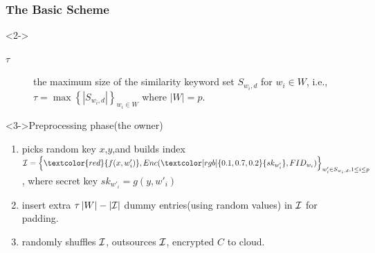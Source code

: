 \documentclass[handout]{beamer}
\begin{document}
\begin{frame}
	\frametitle{The Basic Scheme}
	\begin{block}<2->{}
		\begin{description}
			\item[$\tau $]the maximum size of the similarity keyword set $S_{{w_i},d}$ for ${w_i} \in W$, i.e.,$\tau  = \max {\left\{ {\left| {{S_{{w_i},d}}} \right|} \right\}_{{w_i} \in W}}$ where $\left| W \right| = p$.
		\end{description}
	\end{block}
		\begin{exampleblock}<3->{Preprocessing phase(the owner)}
			\begin{enumerate}
				\item<4->  picks random key $x$,$y$,and builds index ${\cal I} = {\left\{ {\textcolor{red}{f(x,w{'_i})},Enc(\textcolor[rgb]{0.1,0.7,0.2}{s{k_{w{'_i}}}},FI{D_{{w_i}}})} \right\}_{w{'_i} \in {S_{{w_i},d}},1 \le i \le p}}$, where secret key \textcolor[rgb]{0.1,0.7,0.2}{$s{k_{w{'_i}}} = g(y,w{'_i})$}
				\item<5-> insert extra $\tau \left| W \right| - \left| {\cal I} \right|$ dummy entries(using random values) in $\cal I$ for padding.
				\item<6-> randomly shuffles $\cal I$, outsources $\cal I$, encrypted $C$ to cloud.
			\end{enumerate}
		\end{exampleblock}
	\end{frame}
\end{document}
